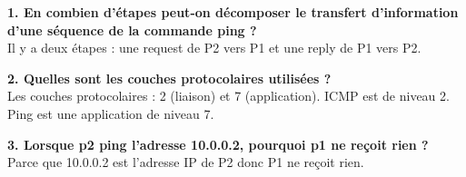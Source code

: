 \documentclass[a4paper]{article}
\begin{document}
\textbf{1. En combien d'étapes peut-on décomposer le transfert d’information d’une séquence de la commande ping ?}\\
Il y a deux étapes : une request de P2 vers P1 et une reply de P1 vers P2.

\textbf{2. Quelles sont les couches protocolaires utilisées ?}\\
Les couches protocolaires : 2 (liaison) et 7 (application). ICMP est de niveau 2. Ping est une application de niveau 7.

\textbf{3. Lorsque p2 ping l’adresse 10.0.0.2, pourquoi p1 ne reçoit rien ?}\\
Parce que 10.0.0.2 est l'adresse IP de P2 donc P1 ne reçoit rien.	
\end{document}
